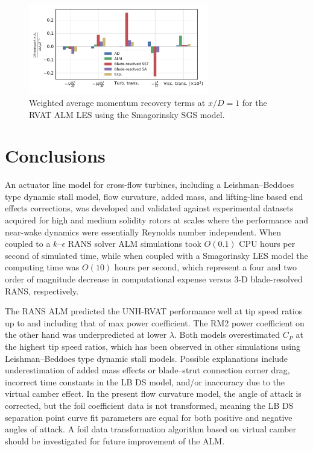 \documentclass[times]{weauth}
\begin{document}
\begin{figure}
    \centering

    \includegraphics[width=0.7\textwidth]{RVAT-ALM-LES_recovery-bar-chart}

    \caption{Weighted average momentum recovery terms at $x/D=1$ for the RVAT
        ALM LES using the Smagorinsky SGS model.}

    \label{fig:RVAT-ALM-LES-recovery}
\end{figure}


\section{Conclusions}

An actuator line model for cross-flow turbines, including a Leishman--Beddoes
type dynamic stall model, flow curvature, added mass, and lifting-line based end
effects corrections, was developed and validated against experimental datasets
acquired for high and medium solidity rotors at scales where the performance and
near-wake dynamics were essentially Reynolds number independent. When coupled to
a $k$--$\epsilon$ RANS solver ALM simulations took $O(0.1)$ CPU hours per second
of simulated time, while when coupled with a Smagorinsky LES model the computing
time was $O(10)$ hours per second, which represent a four and two order of
magnitude decrease in computational expense versus 3-D blade-resolved RANS,
respectively.

The RANS ALM predicted the UNH-RVAT performance well at tip speed ratios up to
and including that of max power coefficient. The RM2 power coefficient on the
other hand was underpredicted at lower $\lambda$. Both models overestimated
$C_P$ at the highest tip speed ratios, which has been observed in other
simulations using Leishman--Beddoes type dynamic stall models. Possible
explanations include underestimation of added mass effects or blade--strut
connection corner drag, incorrect time constants in the LB DS model, and/or
inaccuracy due to the virtual camber effect. In the present flow curvature
model, the angle of attack is corrected, but the foil coefficient data is not
transformed, meaning the LB DS separation point curve fit parameters are equal
for both positive and negative angles of attack. A foil data transformation
algorithm based on virtual camber should be investigated for future improvement
of the ALM.
\end{document}
